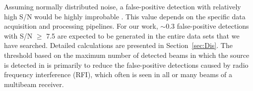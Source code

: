\documentclass[fleqn,usenatbib]{mnras}
\newcommand\jw[1]{\textcolor{blue}{#1}}
\begin{document}


Assuming normally distributed noise, a false-positive detection with relatively high S/N would be highly improbable \citep{Zhang_2020,Parent20}. This value depends on the specific data acquisition and processing pipelines. For our work, $\sim 0.3$ false-positive detections with S/N  $\ge$ 7.5 are expected to be generated in the entire data sets that we have searched. Detailed calculations are presented in Section~\ref{sec:Dis}.
%
 The threshold based on the maximum number of detected beams in which the source is detected in is primarily to reduce the false-positive detections caused by radio frequency interference (RFI), which often is seen in all or many beams of a multibeam receiver.

%
\end{document}

